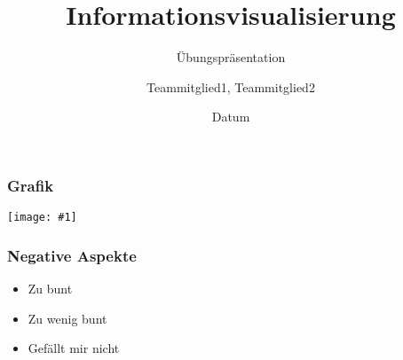 \documentclass[%
11pt,a4paper,xcolor={usenames,dvipsnames}]{beamer}
\author{Teammitglied1, Teammitglied2}
\date{Datum}
\newcommand {\bild}[1]{
         \begin{center}
         \texttt{[image: \#1]}
         \end{center}
}
\begin{document}
	\begin{frame}[plain]	
	\title{Informationsvisualisierung}
    \subtitle{Übungspräsentation}
		\titlepage
	\end{frame}

    \begin{frame}
        \frametitle{Grafik}
        \bild{Beispielbild.png}
    \end{frame}
    
    \begin{frame}
        \frametitle{Negative Aspekte}
        \begin{itemize}
            \item Zu bunt
            \item Zu wenig bunt
            \item Gefällt mir nicht
        \end{itemize}
    \end{frame}
\end{document}
